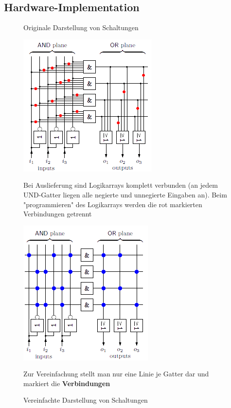 \documentclass[12pt]{report}
\begin{document}
\subsection{Hardware-Implementation}

\begin{figure}[H]
  \begin{minipage}[t]{0.45\textwidth}
    \caption{Originale Darstellung von Schaltungen}
    \includegraphics[height=0.8\textwidth]{PLA_implementation}
    
    Bei Auslieferung sind Logikarrays komplett verbunden (an jedem UND-Gatter liegen alle negierte und unnegierte Eingaben an).
    Beim "programmieren" des Logikarrays werden die rot markierten Verbindungen getrennt
  \end{minipage}
  \hfill
  \begin{minipage}[t]{0.45\textwidth}
    \caption{Vereinfachte Darstellung von Schaltungen}
    \includegraphics[height=0.8\textwidth]{PLA_implementation_simplification}
    
    Zur Vereinfachung stellt man nur eine Linie je Gatter dar und markiert die \textbf{Verbindungen}
  \end{minipage}
\end{figure}
\end{document}
